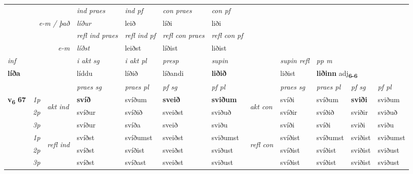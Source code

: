 \begin{longtable}[l]{X>{\footnotesize\itshape}llXXXXlXXXX}
   && &  \textit{ind praes} & \textit{ind pf} & \textit{con praes} & \textit{con pf} \\*
\multicolumn{3}{r}{\textit{e-m / það}} & líður & leið & líði & liði \\*

\cmidrule{4-7}
 & && \textit{refl ind praes} & \textit{refl ind pf} & \textit{refl con praes} & \textit{refl con pf} \\*
\multicolumn{3}{r}{\textit{e-m}}& líðst & leiðst & líðist & liðist \\*

\cmidrule{4-7}
   {\textit{inf}} & &  & \textit{i akt sg} & \textit{i akt pl}   & \textit{presp} & \textit{supin} && \textit{supin refl} & \textit{pp m} \\*
  {\textbf{líða}} & && líddu  & líðið   & líðandi &  \textbf{liðið} && liðist & \multicolumn{2}{l}{\textbf{liðinn} adj\textbf{\textsubscript{6-6}}} \\*

\midrule

 & &   & \textit{praes sg}  & \textit{praes pl}    & \textit{ pf sg} & \textit{pf pl} & & \textit{praes sg}  & \textit{praes pl}    & \textit{pf sg} & \textit{pf pl }  \\ \cmidrule{4-7} \cmidrule{9-12}
 \multirow{2}{*}{{{\textbf{v{\textsubscript{6}}} \Large{\textbf{67}}}}}  & 1p & \multirow{3}{*}{\begin{turn}{90}\textit{akt ind}\end{turn}} & \textbf{svíð} & svíðum & \textbf{sveið} & \textbf{sviðum} & \multirow{3}{*}{\begin{turn}{90}\textit{akt con}\end{turn}} &svíði & svíðum & \textbf{sviði} & sviðum\\*
 & 2p &  &  svíður  & svíðið & sveiðst & sviðuð & & svíðir & svíðið & sviðir & sviðuð \\*
 & 3p &  & svíður & svíða & sveið & sviðu & & svíði & svíði& sviði & sviðu \\*
\cmidrule{4-7} \cmidrule{9-12}
 & 1p & \multirow{3}{*}{\begin{turn}{90}\textit{refl ind}\end{turn}}  & svíðst & svíðumst & sveiðst & sviðumst & \multirow{3}{*}{\begin{turn}{90}\textit{refl con}\end{turn}}  &svíðist & svíðumst & sviðist & sviðumst \\*
 & 2p &  & svíðst & svíðist & sveiðst & sviðust & &svíðist & svíðist & sviðist & sviðust \\*
 & 3p  & & svíðst & svíðast & sveiðst & sviðust & & svíðist & svíðist& sviðist & sviðust \\*
\cmidrule{4-7} \cmidrule{9-12}


\end{longtable}

